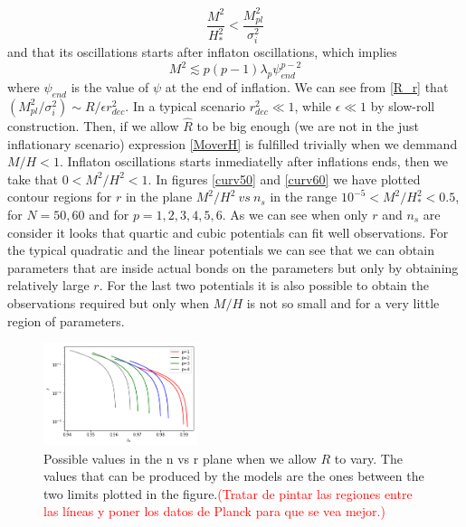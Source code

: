 \documentclass[amssymb,twocolumn,prd,nofootinbib,showpacs]{revtex4-1}
\begin{document}
\begin{equation}\label{MoverH}
\frac{M^2}{H^2_*}<\frac{M_{pl}^2}{\sigma_i^2}
\end{equation} 
and that its oscillations starts after inflaton oscillations, which implies
\begin{equation}\label{M2curv}
M^2\lesssim p(p-1)\lambda_p \psi_{end}^{p-2}
\end{equation}
where $\psi_{end}$ is the value of $\psi$ at the end of inflation. We can see from \eqref{R_r} that $(M_{pl}^2/\sigma_i^2)\sim R/\epsilon r_{dec}^2$. In a typical scenario $r_{dec}^2\ll 1$, while $\epsilon\ll 1$ by slow-roll construction. Then, if we allow $\hat R$ to be big enough (we are not in the just inflationary scenario) expression \eqref{MoverH} is fulfilled trivially when we demmand $M/H<1$. Inflaton oscillations starts inmediatelly after inflations ends, then we take that $0<M^2/H^2<1$. In figures \ref{curv50} and \ref{curv60} we have plotted contour regions for $r$ in the plane $M^2/H^2\ vs\ n_s$ in the range $10^{-5}<M^2/H_*^2<0.5$, for $N=50,60$ and for $p=1,2,3,4,5,6$. As we can see when only $r$ and $n_s$ are consider it looks that quartic and cubic potentials can fit well observations. For the typical quadratic and the linear potentials we can see that we can obtain parameters that are inside actual bonds on the parameters but only by obtaining relatively large $r$. For the last two potentials it is also possible to obtain the observations required but only when $M/H$ is not so small and for a very little region of parameters.   
\begin{figure}
\centering
\includegraphics[width=0.4\textwidth]{nvsr}
\caption{Possible values in the n vs r plane when we allow $R$ to vary. The values that can be produced by the models are the ones between the two limits plotted in the figure.\textcolor{red}{(Tratar de pintar las regiones entre las l\'ineas y poner los datos de Planck para que se vea mejor.)}}
\label{nvsr}
\end{figure}
%
\end{document}
